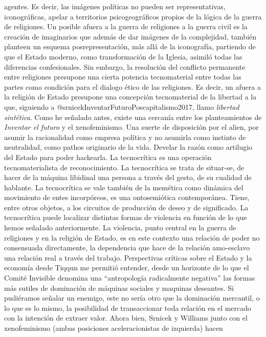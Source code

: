 \documentclass[
]{article}
\begin{document}
agentes. Es decir, las imágenes políticas no pueden ser representativas,
iconográficas, apelar a territorios psicogeográficos propios de la
lógica de la guerra de religiones. Un posible afuera a la guerra de
religiones a la guerra civil es la creación de imaginarios que además de
dar imágenes de la complejidad, también planteen un esquema
posrepresentación, más allá de la iconografía, partiendo de que el
Estado moderno, como transformación de la Iglesia, asimiló todas las
diferencias confesionales. Sin embargo, la resolución del conflicto
permanente entre religiones presupone una cierta potencia tecnomaterial
entre todas las partes como condición para el dialogo ético de las
religiones. Es decir, un afuera a la religión de Estado presupone una
concepción tecnomaterial de la libertad a la que, siguiendo a
@srnicekInventarFuturoPoscapitalismo2017, llamo \emph{libertad
sintética}. Como he señalado antes, existe una cercanía entre los
planteamientos de \emph{Inventar el futuro} y el xenofeminismo. Una
suerte de disposición por el alien, por asumir la racionalidad como
empresa política y no asumirla como instinto de neutralidad, como pathos
originario de la vida. Develar la razón como artilugio del Estado para
poder hackearla. La tecnocrítica es una operación tecnomaterialista de
reconocimiento. La tecnocrítica se trata de situar-se, de hacer de la
máquina libidinal una persona a través del gesto, de su cualidad de
hablante. La tecnocrítica se vale también de la memética como dinámica
del movimiento de entes incorpóreos, es una ontosemiótica contemporánea.
Tiene, entre otros objetos, a los circuitos de producción de deseo y de
significado. La tecnocrítica puede localizar distintas formas de
violencia en función de lo que hemos señalado anteriormente. La
violencia, punto central en la guerra de religiones y en la religión de
Estado, es en este contexto una relación de poder no consensuada
directamente, la dependencia que hace de la relación amo-esclavo una
relación real a través del trabajo. Perspectivas críticas sobre el
Estado y la economía desde Tiqqun me permitió entender, desde un
horizonte de lo que el Comité Invisible denomina una ``antropología
radicalmente negativa'' las formas más sutiles de dominación de máquinas
sociales y maquinas deseantes. Si pudiéramos señalar un enemigo, este no
sería otro que la dominación mercantil, o lo que es lo mismo, la
posibilidad de transaccionar toda relación en el mercado con la
intención de extraer valor. Ahora bien, Srnicek y Williams junto con el
xenofeminismo (ambas posiciones aceleracionistas de izquierda) hacen
\end{document}
